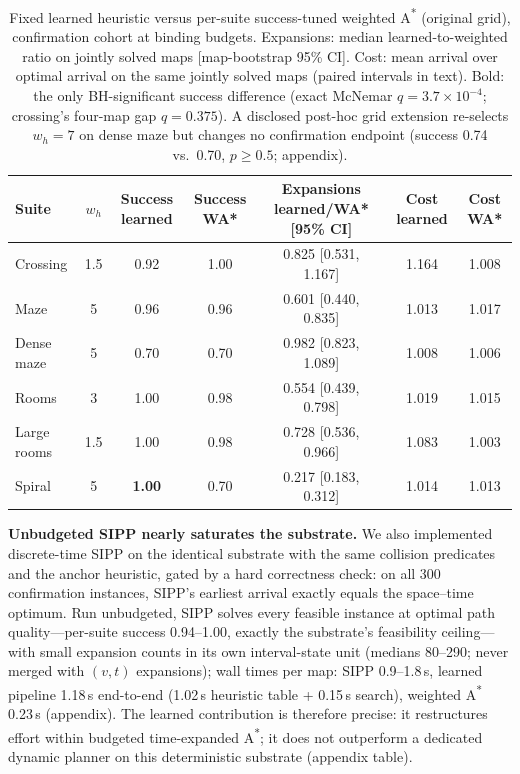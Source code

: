 \documentclass[letterpaper]{article} %
\begin{document}
\begin{table}[t]
\centering
\small
\begin{tabular}{lcccccc}
\toprule
Suite & $w_h$ & Success learned & Success WA* & Expansions learned/WA* [95\% CI] & Cost learned & Cost WA* \\
\midrule
Crossing & 1.5 & 0.92 & 1.00 & 0.825 [0.531, 1.167] & 1.164 & 1.008 \\
Maze & 5 & 0.96 & 0.96 & 0.601 [0.440, 0.835] & 1.013 & 1.017 \\
Dense maze & 5 & 0.70 & 0.70 & 0.982 [0.823, 1.089] & 1.008 & 1.006 \\
Rooms & 3 & 1.00 & 0.98 & 0.554 [0.439, 0.798] & 1.019 & 1.015 \\
Large rooms & 1.5 & 1.00 & 0.98 & 0.728 [0.536, 0.966] & 1.083 & 1.003 \\
Spiral & 5 & \textbf{1.00} & 0.70 & 0.217 [0.183, 0.312] & 1.014 & 1.013 \\
\bottomrule
\end{tabular}
\caption{Fixed learned heuristic versus per-suite success-tuned weighted A\textsuperscript{*} (original grid), confirmation cohort at binding budgets. Expansions: median learned-to-weighted ratio on jointly solved maps [map-bootstrap 95\% CI]. Cost: mean arrival over optimal arrival on the same jointly solved maps (paired intervals in text). Bold: the only BH-significant success difference (exact McNemar $q{=}3.7\times10^{-4}$; crossing's four-map gap $q{=}0.375$). A disclosed post-hoc grid extension re-selects $w_h{=}7$ on dense maze but changes no confirmation endpoint (success 0.74 vs.\ 0.70, $p \geq 0.5$; appendix).}
\label{tab:wastar-main}
\end{table}

\textbf{Unbudgeted SIPP nearly saturates the substrate.} We also implemented discrete-time SIPP \citep{phillips2011sipp} on the identical substrate with the same collision predicates and the anchor heuristic, gated by a hard correctness check: on all 300 confirmation instances, SIPP's earliest arrival exactly equals the space--time optimum. Run unbudgeted, SIPP solves every feasible instance at optimal path quality---per-suite success 0.94--1.00, exactly the substrate's feasibility ceiling---with small expansion counts in its own interval-state unit (medians 80--290; never merged with $(v,t)$ expansions); wall times per map: SIPP 0.9--1.8\,s, learned pipeline 1.18\,s end-to-end (1.02\,s heuristic table + 0.15\,s search), weighted A\textsuperscript{*} 0.23\,s (appendix). The learned contribution is therefore precise: it restructures effort within budgeted time-expanded A\textsuperscript{*}; it does not outperform a dedicated dynamic planner on this deterministic substrate (appendix table).
\end{document}
